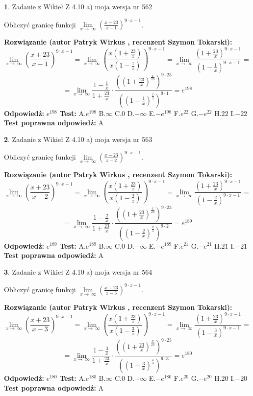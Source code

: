 \documentclass[12pt, a4paper]{article}
\theoremstyle{definition} %
\newtheorem{zad}{}
\newcommand{\zadStart}[1]{\begin{zad}#1\newline}
\newcommand{\zadStop}{\end{zad}}
\newcommand{\rozwStart}[2]{\noindent \textbf{Rozwiązanie (autor #1 , recenzent #2): }\newline}
\newcommand{\rozwStop}{\newline}
\newcommand{\odpStart}{\noindent \textbf{Odpowiedź:}\newline}
\newcommand{\odpStop}{\newline}
\newcommand{\testStart}{\noindent \textbf{Test:}\newline}
\newcommand{\testStop}{\newline}
\newcommand{\kluczStart}{\noindent \textbf{Test poprawna odpowiedź:}\newline}
\newcommand{\kluczStop}{\newline}
\begin{document}
\zadStart{Zadanie z Wikieł Z 4.10 a) moja wersja nr 562}

Obliczyć granicę funkcji  $\lim\limits_{x\to\ \infty}(\frac{x+23}{x-1})^{9\cdot x-1}$.
\zadStop
\rozwStart{Patryk Wirkus}{Szymon Tokarski}
$$\lim\limits_{x\to\ \infty}(\frac{x+23}{x-1})^{9\cdot x-1} = \lim\limits_{x\to\ \infty}(\frac{x(1+\frac{23}{x})}{x(1-\frac{1}{x})})^{9\cdot x-1}=\lim\limits_{x\to\ \infty}\frac{(1+\frac{23}{x})^{9\cdot x-1}}{(1-\frac{1}{x})^{9\cdot x-1}}=$$
$$=\lim\limits_{x\to\ \infty}\frac{1-\frac{1}{x}}{1+\frac{23}{x}}\cdot\frac{((1+\frac{23}{x})^{\frac{x}{23}})^{9\cdot23}}{((1-\frac{1}{x})^{\frac{x}{1}})^{9\cdot1}}=e^{198}$$
\rozwStop
\odpStart
$e^{198}$
\odpStop
\testStart
A.$e^{198}$ B.$\infty$ C.$0$ D.$-\infty$ E.$-e^{198}$
F.$e^{22}$ G.$-e^{22}$
H.$22$
I.$-22$
\testStop
\kluczStart
A
\kluczStop



\zadStart{Zadanie z Wikieł Z 4.10 a) moja wersja nr 563}

Obliczyć granicę funkcji  $\lim\limits_{x\to\ \infty}(\frac{x+23}{x-2})^{9\cdot x-1}$.
\zadStop
\rozwStart{Patryk Wirkus}{Szymon Tokarski}
$$\lim\limits_{x\to\ \infty}(\frac{x+23}{x-2})^{9\cdot x-1} = \lim\limits_{x\to\ \infty}(\frac{x(1+\frac{23}{x})}{x(1-\frac{2}{x})})^{9\cdot x-1}=\lim\limits_{x\to\ \infty}\frac{(1+\frac{23}{x})^{9\cdot x-1}}{(1-\frac{2}{x})^{9\cdot x-1}}=$$
$$=\lim\limits_{x\to\ \infty}\frac{1-\frac{2}{x}}{1+\frac{23}{x}}\cdot\frac{((1+\frac{23}{x})^{\frac{x}{23}})^{9\cdot23}}{((1-\frac{2}{x})^{\frac{x}{2}})^{9\cdot2}}=e^{189}$$
\rozwStop
\odpStart
$e^{189}$
\odpStop
\testStart
A.$e^{189}$ B.$\infty$ C.$0$ D.$-\infty$ E.$-e^{189}$
F.$e^{21}$ G.$-e^{21}$
H.$21$
I.$-21$
\testStop
\kluczStart
A
\kluczStop



\zadStart{Zadanie z Wikieł Z 4.10 a) moja wersja nr 564}

Obliczyć granicę funkcji  $\lim\limits_{x\to\ \infty}(\frac{x+23}{x-3})^{9\cdot x-1}$.
\zadStop
\rozwStart{Patryk Wirkus}{Szymon Tokarski}
$$\lim\limits_{x\to\ \infty}(\frac{x+23}{x-3})^{9\cdot x-1} = \lim\limits_{x\to\ \infty}(\frac{x(1+\frac{23}{x})}{x(1-\frac{3}{x})})^{9\cdot x-1}=\lim\limits_{x\to\ \infty}\frac{(1+\frac{23}{x})^{9\cdot x-1}}{(1-\frac{3}{x})^{9\cdot x-1}}=$$
$$=\lim\limits_{x\to\ \infty}\frac{1-\frac{3}{x}}{1+\frac{23}{x}}\cdot\frac{((1+\frac{23}{x})^{\frac{x}{23}})^{9\cdot23}}{((1-\frac{3}{x})^{\frac{x}{3}})^{9\cdot3}}=e^{180}$$
\rozwStop
\odpStart
$e^{180}$
\odpStop
\testStart
A.$e^{180}$ B.$\infty$ C.$0$ D.$-\infty$ E.$-e^{180}$
F.$e^{20}$ G.$-e^{20}$
H.$20$
I.$-20$
\testStop
\kluczStart
A
\kluczStop
\end{document}
